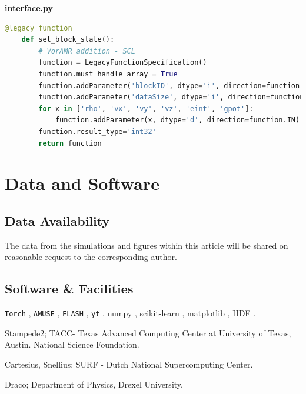 \documentclass[twoside]{drexel-thesis}
\begin{document}
\textbf{interface.py}
\begin{lstlisting}[language=Python]
@legacy_function
    def set_block_state():
        # VorAMR addition - SCL
        function = LegacyFunctionSpecification()
        function.must_handle_array = True
        function.addParameter('blockID', dtype='i', direction=function.IN)
        function.addParameter('dataSize', dtype='i', direction=function.IN)
        for x in ['rho', 'vx', 'vy', 'vz', 'eint', 'gpot']:
            function.addParameter(x, dtype='d', direction=function.IN)
        function.result_type='int32'
        return function
\end{lstlisting}
\chapter{Data and Software}

\section*{Data Availability}
The data from the simulations and figures within this article will be shared on reasonable request to the corresponding author.
\section*{Software \& Facilities}
\texttt{Torch} \citep{wall_collisional_2019,wall_modeling_2020}, \texttt{AMUSE} \citep{portegies_zwart_multiphysics_2009,portegies_zwart_multi-physics_2013,pelupessy_astrophysical_2013,portegies_zwart_astrophysical_2018}, \texttt{FLASH} \citep{fryxell_flash_2000}, \texttt{yt} \citep{turk_yt_2011}, numpy \citep{oliphant_python_2007}, scikit-learn \citep{pedregosa_f_scikit-learn_2011}, matplotlib \citep{hunter_matplotlib_2007}, HDF \citep{koranne_hierarchical_2011}.

Stampede2; TACC- Texas Advanced Computing Center at University of Texas, Austin. National Science Foundation.

Cartesius, Snellius; SURF - Dutch National Supercomputing Center.

Draco; Department of Physics, Drexel University.


\end{document}
